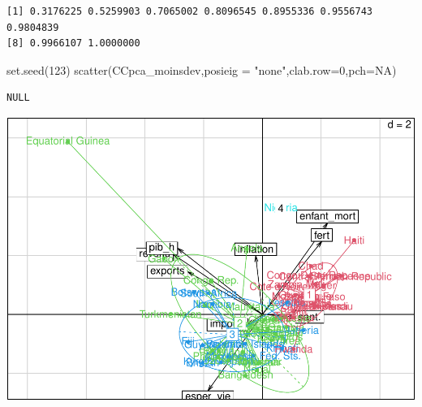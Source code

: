 \documentclass[
]{article}
\newenvironment{Shaded}{}{}
\newcommand{\AttributeTok}[1]{#1}
\newcommand{\ConstantTok}[1]{#1}
\newcommand{\DecValTok}[1]{#1}
\newcommand{\FunctionTok}[1]{#1}
\newcommand{\NormalTok}[1]{#1}
\newcommand{\SpecialCharTok}[1]{\textcolor[rgb]{0.00,0.50,0.50}{#1}}
\newcommand{\StringTok}[1]{\textcolor[rgb]{0.00,0.50,0.50}{#1}}
\begin{document}
\begin{verbatim}
[1] 0.3176225 0.5259903 0.7065002 0.8096545 0.8955336 0.9556743 0.9804839
[8] 0.9966107 1.0000000
\end{verbatim}

\begin{Shaded}
\begin{Highlighting}[]
\FunctionTok{set.seed}\NormalTok{(}\DecValTok{123}\NormalTok{)}
\FunctionTok{scatter}\NormalTok{(CCpca\_moinsdev,}\AttributeTok{posieig =} \StringTok{"none"}\NormalTok{,}\AttributeTok{clab.row=}\DecValTok{0}\NormalTok{,}\AttributeTok{pch=}\ConstantTok{NA}\NormalTok{)}
\end{Highlighting}
\end{Shaded}

\begin{verbatim}
NULL
\end{verbatim}

\begin{Shaded}
\end{Shaded}

\includegraphics{Projet_files/figure-latex/unnamed-chunk-39-1.pdf}
\end{document}
